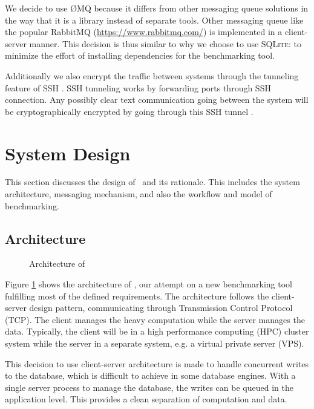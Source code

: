 We decide to use \O MQ because it differs from other messaging queue solutions in the way that it is a library instead of separate tools.
Other messaging queue like the popular RabbitMQ (\url{https://www.rabbitmq.com/}) is implemented in a client-server manner.
This decision is thus similar to why we choose to use \textsc{SQLite}: to minimize the effort of installing dependencies for the benchmarking tool.

Additionally we also encrypt the traffic between systems through the tunneling feature of SSH \citep{ylonen2005secure}.
SSH tunneling works by forwarding ports through SSH connection.
Any possibly clear text communication going between the system will be cryptographically encrypted by going through this SSH tunnel \citep{dusiPreliminaryLookPrivacy2008}.


\section{System Design}
\label{sec:impl.design}

This section discusses the design of \OurBenchmarkingTool~and its rationale.
This includes the system architecture, messaging mechanism, and also the workflow and model of benchmarking.

\subsection{Architecture}
\label{sec:impl.architecture}

\begin{figure}
    \centering
    \caption{Architecture of \OurBenchmarkingTool}
    \label{fig:architecture}
\end{figure}

Figure \ref{fig:architecture} shows the architecture of \OurBenchmarkingTool, our attempt on a new benchmarking tool fulfilling most of the defined requirements.
The architecture follows the client-server design pattern, communicating through Transmission Control Protocol (TCP).
The client manages the heavy computation while the server manages the data.
Typically, the client will be in a high performance computing (HPC) cluster system while the server in a separate system, e.g. a virtual private server (VPS).

This decision to use client-server architecture is made to handle concurrent writes to the database, which is difficult to achieve in some database engines.
With a single server process to manage the database, the writes can be queued in the application level.
This provides a clean separation of computation and data.

